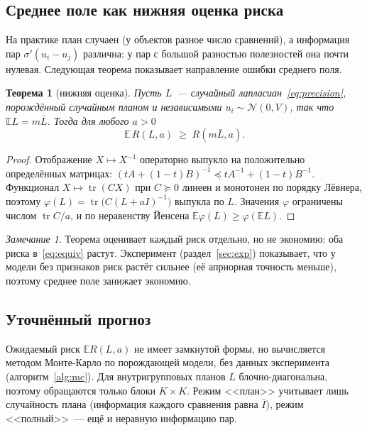 \documentclass{article}
\newtheorem{theorem}{Теорема}
\theoremstyle{definition}
\theoremstyle{remark}
\newtheorem{remark}{Замечание}
\newcommand{\E}{\mathbb{E}}
\newcommand{\tr}{\operatorname{tr}}
\newcommand{\Lbar}{\bar{L}}
\newcommand{\Ibar}{\bar{I}}
\begin{document}
\subsection{Среднее поле как нижняя оценка риска}

На практике план случаен (у объектов разное число сравнений), а информация пар $\sigma'(u_i-u_j)$ различна: у пар с большой разностью полезностей она почти нулевая. Следующая теорема показывает направление ошибки среднего поля.

\begin{theorem}[нижняя оценка]\label{thm:jensen}
Пусть $L$~--- случайный лапласиан~\eqref{eq:precision}, порождённый случайным планом и независимыми $u_i\sim\mathcal N(0,V)$, так что $\E L=m\Lbar$. Тогда для любого $a>0$
\[
\E\,R(L,a)\;\ge\;R(m\Lbar,a).
\]
\end{theorem}
\begin{proof}
Отображение $X\mapsto X^{-1}$ операторно выпукло на положительно определённых матрицах: $(tA+(1-t)B)^{-1}\preceq tA^{-1}+(1-t)B^{-1}$. Функционал $X\mapsto\tr(CX)$ при $C\succeq0$ линеен и монотонен по порядку Лёвнера, поэтому $\varphi(L)=\tr\bigl(C(L+aI)^{-1}\bigr)$ выпукла по $L$. Значения $\varphi$ ограничены числом $\tr C/a$, и по неравенству Йенсена $\E\varphi(L)\ge\varphi(\E L)$.
\end{proof}

\begin{remark}
Теорема оценивает каждый риск отдельно, но не экономию: оба риска в~\eqref{eq:equiv} растут. Эксперимент (раздел~\ref{sec:exp}) показывает, что у модели без признаков риск растёт сильнее (её априорная точность меньше), поэтому среднее поле занижает экономию.
\end{remark}

\subsection{Уточнённый прогноз}

Ожидаемый риск $\E R(L,a)$ не имеет замкнутой формы, но вычисляется методом Монте-Карло по порождающей модели, без данных эксперимента (алгоритм~\ref{alg:mc}). Для внутригрупповых планов $L$ блочно-диагональна, поэтому обращаются только блоки $K\times K$. Режим <<план>> учитывает лишь случайность плана (информация каждого сравнения равна $\Ibar$), режим <<полный>>~--- ещё и неравную информацию пар.
\end{document}
